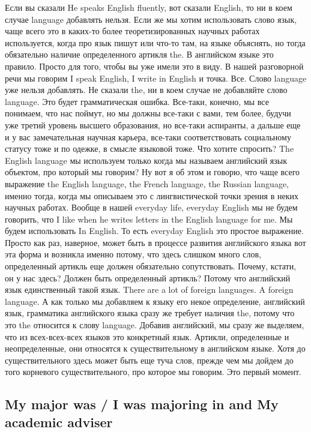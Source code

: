 \documentclass[main.tex]{subfiles}
\begin{document}
Если вы сказали He speaks English fluently, вот сказали English, то ни в коем случае language добавлять нельзя.
Если же мы хотим использовать слово язык, чаще всего это в каких-то более теоретизированных научных работах используется, когда про язык пишут или что-то там, на языке объяснять, но тогда обязательно наличие определенного артикля the.
В английском языке это правило.
Просто для того, чтобы вы уже имели это в виду.
В нашей разговорной речи мы говорим I speak English, I write in English и точка.
Все.
Слово language уже нельзя добавлять.
Не сказали the, ни в коем случае не добавляйте слово language.
Это будет грамматическая ошибка.
Все-таки, конечно, мы все понимаем, что нас поймут, но мы должны все-таки с вами, тем более, будучи уже третий уровень высшего образования, но все-таки аспиранты, а дальше еще и у вас замечательная научная карьера, все-таки соответствовать социальному статусу тоже и по одежке, в смысле языковой тоже.
Что хотите спросить? The English language мы используем только когда мы называем английский язык объектом, про который мы говорим?
Ну вот я об этом и говорю, что чаще всего выражение the English language, the French language, the Russian language, именно тогда, когда мы описываем это с лингвистической точки зрения в неких научных работах.
Вообще в нашей everyday life, everyday English мы не будем говорить, что I like when he writes letters in the English language for me.
Мы будем использовать In English.
То есть everyday English это простое выражение.
Просто как раз, наверное, может быть в процессе развития английского языка вот эта форма и возникла именно потому, что здесь слишком много слов, определенный артикль еще должен обязательно сопутствовать.
Почему, кстати, он у нас здесь?
Должен быть определенный артикль?
Потому что английский язык единственный такой язык.
There are a lot of foreign languages.
A foreign language.
А как только мы добавляем к языку его некое определение, английский язык, грамматика английского языка сразу же требует наличия the, потому что это the относится к слову language.
Добавив английский, мы сразу же выделяем, что из всех-всех-всех языков это конкретный язык.
Артикли, определенные и неопределенные, они относятся к существительному в английском языке.
Хотя до существительного здесь может быть еще туча слов, прежде чем мы дойдем до того корневого существительного, про которое мы говорим.
Это первый момент.

\subsection{My major was / I was majoring in and My academic adviser}
\end{document}
